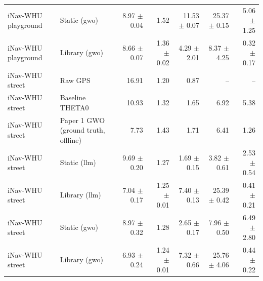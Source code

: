 \begin{tabular}{llrrrrr}
iNav-WHU playground & Static (gwo) & 8.97 $\pm$ 0.04 & 1.52 & 11.53 $\pm$ 0.07 & 25.37 $\pm$ 0.15 & 5.06 $\pm$ 1.25 \\
iNav-WHU playground & Library (gwo) & 8.66 $\pm$ 0.07 & 1.36 $\pm$ 0.02 & 4.29 $\pm$ 2.01 & 8.37 $\pm$ 4.25 & 0.32 $\pm$ 0.17 \\
iNav-WHU street & Raw GPS & 16.91 & 1.20 & 0.87 & -- & -- \\
iNav-WHU street & Baseline THETA0 & 10.93 & 1.32 & 1.65 & 6.92 & 5.38 \\
iNav-WHU street & Paper 1 GWO (ground truth, offline) & 7.73 & 1.43 & 1.71 & 6.41 & 1.26 \\
iNav-WHU street & Static (llm) & 9.69 $\pm$ 0.20 & 1.27 & 1.69 $\pm$ 0.15 & 3.82 $\pm$ 0.61 & 2.53 $\pm$ 0.54 \\
iNav-WHU street & Library (llm) & 7.04 $\pm$ 0.17 & 1.25 $\pm$ 0.01 & 7.40 $\pm$ 0.13 & 25.39 $\pm$ 0.42 & 0.41 $\pm$ 0.21 \\
iNav-WHU street & Static (gwo) & 8.97 $\pm$ 0.32 & 1.28 & 2.65 $\pm$ 0.17 & 7.96 $\pm$ 0.50 & 6.49 $\pm$ 2.80 \\
iNav-WHU street & Library (gwo) & 6.93 $\pm$ 0.24 & 1.24 $\pm$ 0.01 & 7.32 $\pm$ 0.66 & 25.76 $\pm$ 4.06 & 0.44 $\pm$ 0.22 \\
\bottomrule
\end{tabular}
